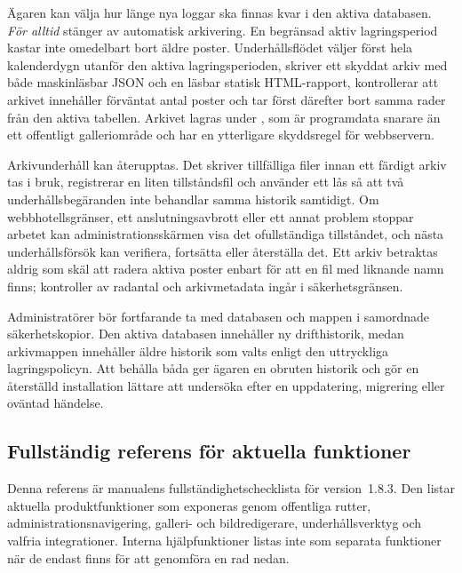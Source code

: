 \documentclass[11pt,a4paper]{article}
\newcommand{\version}{1.8.3}
\newcommand{\filepath}[1]{\path{#1}}
\begin{document}
Ägaren kan välja hur länge nya loggar ska finnas kvar i den aktiva databasen.
\emph{För alltid} stänger av automatisk arkivering. En begränsad aktiv
lagringsperiod kastar inte omedelbart bort äldre poster. Underhållsflödet väljer
först hela kalenderdygn utanför den aktiva lagringsperioden, skriver ett skyddat
arkiv med både maskinläsbar JSON och en läsbar statisk HTML-rapport,
kontrollerar att arkivet innehåller förväntat antal poster och tar först
därefter bort samma rader från den aktiva tabellen. Arkivet lagras under
\filepath{data/admin-log-archives/}, som är programdata snarare än ett
offentligt galleriområde och har en ytterligare skyddsregel för webbservern.

Arkivunderhåll kan återupptas. Det skriver tillfälliga filer innan ett färdigt
arkiv tas i bruk, registrerar en liten tillståndsfil och använder ett lås så att
två underhållsbegäranden inte behandlar samma historik samtidigt. Om
webbhotellsgränser, ett anslutningsavbrott eller ett annat problem stoppar
arbetet kan administrationsskärmen visa det ofullständiga tillståndet, och nästa
underhållsförsök kan verifiera, fortsätta eller återställa det. Ett arkiv
betraktas aldrig som skäl att radera aktiva poster enbart för att en fil med
liknande namn finns; kontroller av radantal och arkivmetadata ingår i
säkerhetsgränsen.

Administratörer bör fortfarande ta med databasen och mappen
\filepath{data/admin-log-archives/} i samordnade säkerhetskopior. Den aktiva
databasen innehåller ny drifthistorik, medan arkivmappen innehåller äldre
historik som valts enligt den uttryckliga lagringspolicyn. Att behålla båda ger
ägaren en obruten historik och gör en återställd installation lättare att
undersöka efter en uppdatering, migrering eller oväntad händelse.
\subsection{Fullständig referens för aktuella funktioner}
\label{sec:complete-feature-reference}

Denna referens är manualens fullständighetschecklista för version~\version{}.
Den listar aktuella produktfunktioner som exponeras genom offentliga rutter,
administrationsnavigering, galleri- och bildredigerare, underhållsverktyg och
valfria integrationer. Interna hjälpfunktioner listas inte som separata
funktioner när de endast finns för att genomföra en rad nedan.
\end{document}
